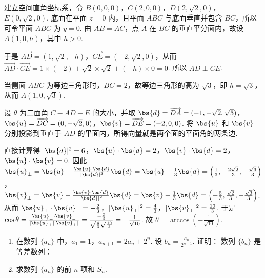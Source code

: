 \begin{solution}
建立空间直角坐标系，令 \(B(0,0,0)\)，\(C(2,0,0)\)，\(D(2,\sqrt{2},0)\)，\(E(0,\sqrt{2},0)\). 底面在平面 \(z=0\) 内，且平面 \(ABC\) 与底面垂直并包含 \(BC\)，所以可令平面 \(ABC\) 为 \(y=0\). 由 \(AB=AC\)，点 \(A\) 在 \(BC\) 的垂直平分面内，故设 \(A(1,0,h)\)，其中 \(h>0\).

于是 \(\overrightarrow{AD}=(1,\sqrt{2},-h)\)，\(\overrightarrow{CE}=(-2,\sqrt{2},0)\)，从而
\(
\overrightarrow{AD}\cdot\overrightarrow{CE}=1\times(-2)+\sqrt{2}\times\sqrt{2}+(-h)\times0=0
\).
所以 \(AD\perp CE\).

当侧面 \(ABC\) 为等边三角形时，\(BC=2\)，故等边三角形的高为 \(\sqrt{3}\)，即 \(h=\sqrt{3}\)，从而 \(A(1,0,\sqrt{3})\).

设 \(\theta\) 为二面角 \(C-AD-E\) 的大小，并取 \(\bs{d}=\overrightarrow{DA}=(-1,-\sqrt{2},\sqrt{3})\)，\(\bs{u}=\overrightarrow{DC}=(0,-\sqrt{2},0)\)，\(\bs{v}=\overrightarrow{DE}=(-2,0,0)\). 将 \(\bs{u}\) 和 \(\bs{v}\) 分别投影到垂直于 \(AD\) 的平面内，所得向量就是两个面的平面角的两条边.

直接计算得 \(\lvert\bs{d}\rvert^2=6\)，\(\bs{u}\cdot\bs{d}=2\)，\(\bs{v}\cdot\bs{d}=2\)，\(\bs{u}\cdot\bs{v}=0\). 因此
\(
\bs{u}_{\perp}=\bs{u}-\frac{\bs{u}\cdot\bs{d}}{\lvert\bs{d}\rvert^2}\bs{d}=\bs{u}-\frac{1}{3}\bs{d}=\left(\frac{1}{3},-\frac{2\sqrt{2}}{3},-\frac{\sqrt{3}}{3}\right)
\)，
\(
\bs{v}_{\perp}=\bs{v}-\frac{\bs{v}\cdot\bs{d}}{\lvert\bs{d}\rvert^2}\bs{d}=\bs{v}-\frac{1}{3}\bs{d}=\left(-\frac{5}{3},\frac{\sqrt{2}}{3},-\frac{\sqrt{3}}{3}\right)
\).
从而
\(
\bs{u}_{\perp}\cdot\bs{v}_{\perp}=-\frac{2}{3}
\)，\(\lvert\bs{u}_{\perp}\rvert^2=\frac{4}{3}\)，\(\lvert\bs{v}_{\perp}\rvert^2=\frac{10}{3}\).
于是
\(
\cos\theta=\frac{\bs{u}_{\perp}\cdot\bs{v}_{\perp}}{\lvert\bs{u}_{\perp}\rvert\lvert\bs{v}_{\perp}\rvert}=\frac{-\frac{2}{3}}{\sqrt{\frac{4}{3}}\sqrt{\frac{10}{3}}}=-\frac{1}{\sqrt{10}}
\).
故 \(\theta=\arccos\left(-\frac{1}{\sqrt{10}}\right)\).
\end{solution}

\begin{problem}
\begin{enumerate}
\item 在数列 \(\{a_{n}\}\) 中，\(a_{1} = 1\)，\(a_{n+1} = 2a_{n} + 2^{n}\). 设 \( b_{n}=\frac{a_{n}}{2^{n-1}} \). 证明： 数列 \( \{b_{n}\} \) 是等差数列；
\item 求数列 \(\{a_{n}\}\) 的前 \(n\) 项和 \( S_{n} \).
\end{enumerate}
\end{problem}

